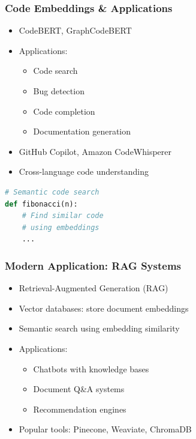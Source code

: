 \begin{frame}[fragile]\frametitle{Code Embeddings \& Applications}
\begin{itemize}
\item CodeBERT, GraphCodeBERT
\item Applications:
  \begin{itemize}
  \item Code search
  \item Bug detection
  \item Code completion
  \item Documentation generation
  \end{itemize}
\item GitHub Copilot, Amazon CodeWhisperer
\item Cross-language code understanding
\end{itemize}

\begin{lstlisting}[language=Python]
# Semantic code search
def fibonacci(n):
    # Find similar code
    # using embeddings
    ...
\end{lstlisting}
\end{frame}

\begin{frame}[fragile]\frametitle{Modern Application: RAG Systems}
\begin{itemize}
\item Retrieval-Augmented Generation (RAG)
\item Vector databases: store document embeddings
\item Semantic search using embedding similarity
\item Applications:
  \begin{itemize}
  \item Chatbots with knowledge bases
  \item Document Q\&A systems
  \item Recommendation engines
  \end{itemize}
\item Popular tools: Pinecone, Weaviate, ChromaDB
\end{itemize}
\end{frame}

